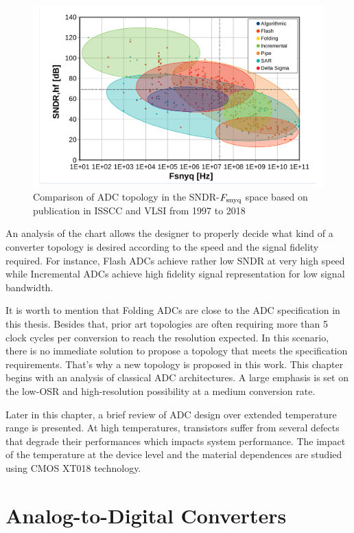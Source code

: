 \begin{figure}[htp]
	\centering
	\includegraphics[width=.8\textwidth]{Chapter2/Figs/Vector/sndr_fsnyq_topology.pdf}
	\caption{Comparison of ADC topology in the SNDR-$F_{\rm snyq}$ space based on publication in ISSCC and VLSI from 1997 to 2018~\cite{MurmannSurvey}}
	\label{fig:topology-sndr-fsnyq-comparison}
\end{figure}
An analysis of the chart allows the designer to properly decide what kind of a converter topology is desired according to the speed and the signal fidelity required. For instance, Flash ADCs achieve rather low SNDR at very high speed while Incremental ADCs achieve high fidelity signal representation for low signal bandwidth. 

It is worth to mention that Folding ADCs are close to the ADC specification in this thesis. Besides that, prior art topologies are often requiring more than 5 clock cycles per conversion to reach the resolution expected. In this scenario, there is no immediate solution to propose a topology that meets the specification requirements. That's why a new topology is proposed in this work. This chapter begins with an analysis of classical ADC architectures. A large emphasis is set on the low-OSR and high-resolution possibility at a medium conversion rate.

Later in this chapter, a brief review of ADC design over extended temperature range is presented. At high temperatures, transistors suffer from several defects that degrade their performances which impacts system performance. The impact of the temperature at the device level and the material dependences are studied using CMOS XT018 technology. 

\section{Analog-to-Digital Converters}
